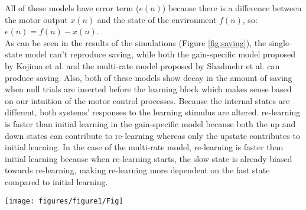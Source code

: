 \documentclass[9pt,twocolumn]{paper-template}
\begin{document}
All of these models have error term ($e(n)$) because there is a difference between the motor output $x(n)$ and the state of the environment $f(n)$, so: $e(n) = f (n) - x(n)$.\\
As can be seen in the results of the simulations (Figure \ref{fig:saving}), the single-state model can't reproduce saving, while both the gain-specific model proposed by Kojima et al. and the multi-rate model proposed by Shadmehr et al. can produce saving. Also, both of these models show decay in the amount of saving when null trials are inserted before the learning block which makes sense based on our intuition of the motor control processes. Because the internal states are different, both systems’ responses to the learning stimulus are altered. re-learning is faster than initial learning in the gain-specific model because both the up and down states can contribute to re-learning whereas only the upstate contributes to initial learning. In the case of the multi-rate model, re-learning is faster than initial learning because when re-learning starts, the
slow state is already biased towards re-learning, making re-learning more dependent on the fast state compared to initial learning.\\



\begin{figure*}[h!]
  \centering
    \texttt{[image: figures/figure1/Fig]}
  \caption{\textbf{Simulations of Motor Adaptation Experiments That Show Savings}\\
  (A) shows the model simulations of the experiment paradigm (Disturbance plot) which is plotted in black. (B) shows a direct comparison of simulated performance in the initial learning and re-learning blocks.  (C) shows the amount of savings found in simulation, as a function of the number of washout trials. The amount of savings is measured as the percent improvement in performance on the 30th trial in the re-learning block compared to the 30th trial in the initial learning block. 
}
  \label{fig:saving}
\end{figure*}
\end{document}
